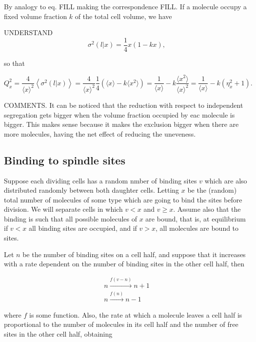 By analogy to eq. FILL making the correspondence FILL. If a molecule occupy a fixed volume fraction $k$ of the total cell volume, we have

UNDERSTAND
\begin{equation}
  \sigma^2(l|x) = \frac{1}{4}x(1-kx),
\end{equation}

so that

\begin{equation}
  Q_x^2 = \frac{4}{\langle x\rangle^2}\left\langle \sigma^2(l|x)\right\rangle = \frac{4}{\langle x\rangle^2}\frac{1}{4}\left(\langle x\rangle-k\langle x^2\rangle\right) = \frac{1}{\langle x\rangle} - k\frac{\langle x^2\rangle}{\langle x\rangle^2} = \frac{1}{\langle x\rangle} - k(\eta_x^2+1).
\end{equation}

COMMENTS. It can be noticed that the reduction with respect to independent segregation gets bigger when the volume fraction occupied by eac molecule is bigger. This makes sense because it makes the exclusion bigger when there are more molecules, having the net effect of reducing the uneveness.

\subsection{Binding to spindle sites}

Suppose each dividing cells has a random nmber of binding sites $v$ which are also distributed randomly between both daughter cells. Letting $x$ be the (random) total number of molecules of some type which are going to bind the sites before division. We will separate cells in which $v<x$ and $v\geq x$. Assume also that the binding is such that all possible molecules of $x$ are bound, that is, at equilibrium if $v<x$ all binding sites are occupied, and if $v>x$, all molecules are bound to sites.

Let $n$ be the number of binding sites on a cell half, and suppose that it increases with a rate dependent on the number of binding sites in the other cell half, then

\begin{equation}
  \begin{split}
    n\xrightarrow{f(v-n)}n+1\\
    n\xrightarrow{f(n)}n-1
  \end{split}
\end{equation}

where $f$ is some function. Also, the rate at which a molecule leaves a cell half is proportional to the number of molecules in its cell half and the number of free sites in the other cell half, obtaining

